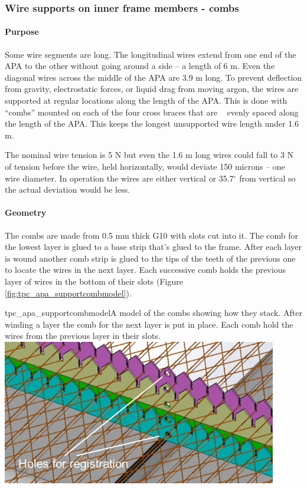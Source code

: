 \subsubsection{Wire supports on inner frame members - combs}
\label{subsec:apa_combs}

\paragraph{Purpose}

Some wire segments are long.  The longitudinal wires extend from one end of the APA to the other without going around a side -- a length of 6 m.  Even the diagonal wires across the middle of the APA are 3.9 m long.  To prevent deflection from gravity, electrostatic forces, or liquid drag from moving argon, the wires are supported at regular locations along the length of the APA.  This is done with ``combs'' mounted on each of the four cross braces that are ~ evenly spaced along the length of the APA.  This keeps the longest unsupported wire length under 1.6 m.

The nominal wire tension is 5 N but even the 1.6 m long wires could fall to 3 N of tension before the wire, held horizontally, would deviate 150 microns -- one wire diameter.  In operation the wires are either vertical or 35.7$^{\circ}$ from vertical so the actual deviation would be less.

\paragraph{Geometry}

The combs are made from 0.5 mm thick G10 with slots cut into it.  The comb for the lowest layer is glued to a base strip that's glued to the frame.  After each layer is wound another comb strip is glued to the tips of the teeth of the previous one to locate the wires in the next layer.  Each successive comb holds the previous layer of wires in the bottom of their slots (Figure \ref{fig:tpc_apa_supportcombmodel}).

\begin{cdrfigure}{tpc_apa_supportcombmodel}{A model of the combs showing how they stack.  After winding a layer the comb for the next layer is put in place.  Each comb hold the wires from the previous layer in their slots.}
\includegraphics[width=0.9\textwidth]{figures/tpc_apa_supportcombmodel.png} 
\end{cdrfigure}

